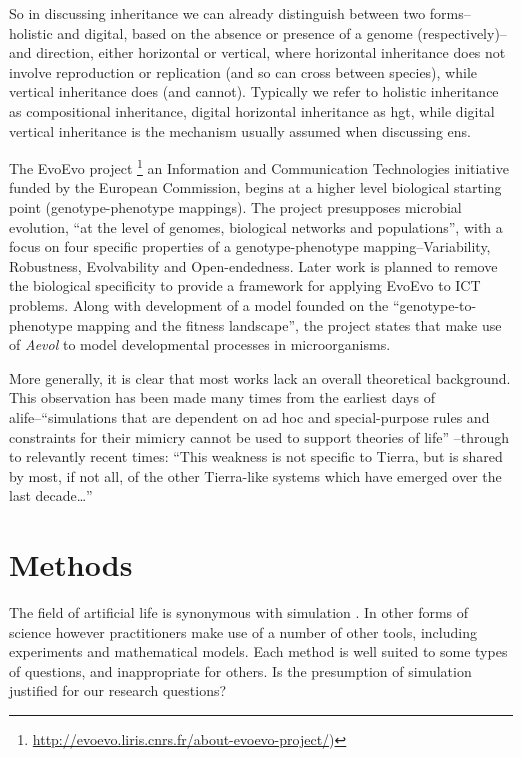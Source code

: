 So in discussing inheritance we can already distinguish between two forms--holistic and digital, based on the absence or presence of a genome (respectively)--and direction, either horizontal or vertical, where horizontal inheritance does not involve reproduction or replication (and so can cross between species), while vertical inheritance does (and cannot). Typically we refer to holistic inheritance as compositional inheritance, digital horizontal inheritance as \gls{hgt},  while digital vertical inheritance is the mechanism usually assumed when discussing \gls{ens}.

\begin{DRAFT}
The EvoEvo project \footnote{\url{http://evoevo.liris.cnrs.fr/about-evoevo-project/})} an Information and Communication Technologies initiative funded by the European Commission, begins at a higher level biological starting point (genotype-phenotype mappings). The project presupposes microbial evolution, ``at the level of genomes, biological networks and populations'', with a focus on four specific properties of a genotype-phenotype mapping--Variability, Robustness, Evolvability and Open-endedness. Later work is planned to remove the biological specificity to provide a framework for applying EvoEvo to ICT problems. Along with development of a model founded on the ``genotype-to-phenotype mapping and the fitness landscape'', the project states that make use of \emph{Aevol} \parencite{Knibbe:2006vn,Knibbe:2007kx} to model developmental processes in microorganisms.

More generally, it is clear that most works lack an overall theoretical background. This observation has been made many times from the earliest days of \gls{alife}--``simulations that are dependent on ad hoc and special-purpose rules and constraints for their mimicry cannot be used to support theories of life''  \parencite{Pattee1988}--through to relevantly recent times: ``This weakness is not specific to Tierra, but is shared by most, if not all, of the other Tierra-like systems which have emerged over the last decade\ldots{}'' \parencite{Taylor2001}
\end{DRAFT}

\chapter{Methods}\label{methods}

The field of artificial life is synonymous with simulation \parencite[chap.2]{Aicardi2010}. In other forms of science however practitioners make use of a number of other tools, including experiments and mathematical models. Each method is well suited to some types of questions, and inappropriate for others. Is the presumption of simulation justified for our research questions?

